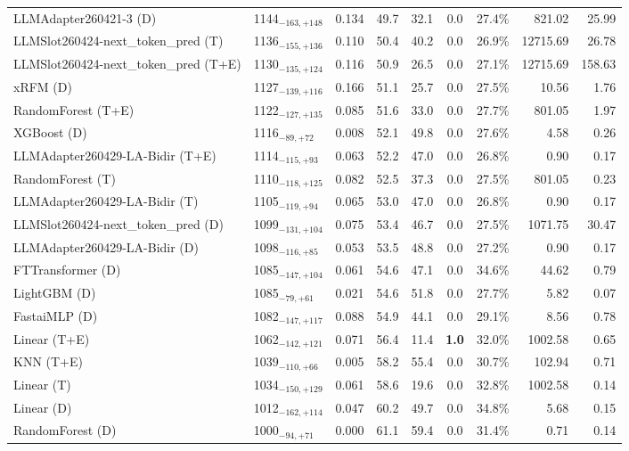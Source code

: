 \begin{tabular}{llcccccrr}
LLMAdapter260421-3 (D) & 1144${}_{-163,+148}$ & 0.134 & 49.7 & 32.1 & 0.0 & 27.4\% & 821.02 & 25.99 \\
LLMSlot260424-next_token_pred (T) & 1136${}_{-155,+136}$ & 0.110 & 50.4 & 40.2 & 0.0 & 26.9\% & 12715.69 & 26.78 \\
LLMSlot260424-next_token_pred (T+E) & 1130${}_{-135,+124}$ & 0.116 & 50.9 & 26.5 & 0.0 & 27.1\% & 12715.69 & 158.63 \\
xRFM (D) & 1127${}_{-139,+116}$ & 0.166 & 51.1 & 25.7 & 0.0 & 27.5\% & 10.56 & 1.76 \\
RandomForest (T+E) & 1122${}_{-127,+135}$ & 0.085 & 51.6 & 33.0 & 0.0 & 27.7\% & 801.05 & 1.97 \\
XGBoost (D) & 1116${}_{-89,+72}$ & 0.008 & 52.1 & 49.8 & 0.0 & 27.6\% & 4.58 & 0.26 \\
LLMAdapter260429-LA-Bidir (T+E) & 1114${}_{-115,+93}$ & 0.063 & 52.2 & 47.0 & 0.0 & 26.8\% & 0.90 & 0.17 \\
RandomForest (T) & 1110${}_{-118,+125}$ & 0.082 & 52.5 & 37.3 & 0.0 & 27.5\% & 801.05 & 0.23 \\
LLMAdapter260429-LA-Bidir (T) & 1105${}_{-119,+94}$ & 0.065 & 53.0 & 47.0 & 0.0 & 26.8\% & 0.90 & 0.17 \\
LLMSlot260424-next_token_pred (D) & 1099${}_{-131,+104}$ & 0.075 & 53.4 & 46.7 & 0.0 & 27.5\% & 1071.75 & 30.47 \\
LLMAdapter260429-LA-Bidir (D) & 1098${}_{-116,+85}$ & 0.053 & 53.5 & 48.8 & 0.0 & 27.2\% & 0.90 & 0.17 \\
FTTransformer (D) & 1085${}_{-147,+104}$ & 0.061 & 54.6 & 47.1 & 0.0 & 34.6\% & 44.62 & 0.79 \\
LightGBM (D) & 1085${}_{-79,+61}$ & 0.021 & 54.6 & 51.8 & 0.0 & 27.7\% & 5.82 & 0.07 \\
FastaiMLP (D) & 1082${}_{-147,+117}$ & 0.088 & 54.9 & 44.1 & 0.0 & 29.1\% & 8.56 & 0.78 \\
Linear (T+E) & 1062${}_{-142,+121}$ & 0.071 & 56.4 & 11.4 & \textcolor{bronze}{\textbf{1.0}} & 32.0\% & 1002.58 & 0.65 \\
KNN (T+E) & 1039${}_{-110,+66}$ & 0.005 & 58.2 & 55.4 & 0.0 & 30.7\% & 102.94 & 0.71 \\
Linear (T) & 1034${}_{-150,+129}$ & 0.061 & 58.6 & 19.6 & 0.0 & 32.8\% & 1002.58 & 0.14 \\
Linear (D) & 1012${}_{-162,+114}$ & 0.047 & 60.2 & 49.7 & 0.0 & 34.8\% & 5.68 & 0.15 \\
RandomForest (D) & 1000${}_{-94,+71}$ & 0.000 & 61.1 & 59.4 & 0.0 & 31.4\% & 0.71 & 0.14 \\

\end{tabular}
